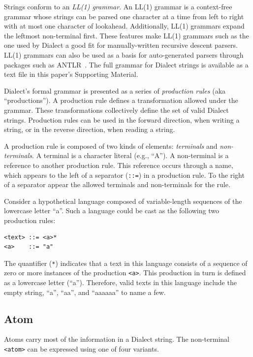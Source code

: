 \documentclass{article}
\def\ttt{\texttt}
\begin{document}
Strings conform to an \textit{LL(1) grammar}.\cite{thain:2020} An LL(1) grammar is a context-free grammar whose strings can be parsed one character at a time from left to right with at most one character of lookahead. Additionally, LL(1) grammars expand the leftmost non-terminal first. These features make LL(1) grammars such as the one used by Dialect a good fit for manually-written recursive descent parsers. LL(1) grammars can also be used as a basis for auto-generated parsers through packages such as ANTLR~\cite{parr:2014}. The full grammar for Dialect strings is available as a text file in this paper's Supporting Material.

Dialect's formal grammar is presented as a series of \textit{production rules} (aka \enquote{productions}). A production rule defines a transformation allowed under the grammar. These transformations collectively define the set of valid Dialect strings. Production rules can be used in the forward direction, when writing a string, or in the reverse direction, when reading a string. 

A production rule is composed of two kinds of elements: \textit{terminals} and \textit{non-terminals}. A terminal is a character literal (e.g., \enquote{A}). A non-terminal is a reference to another production rule. This reference occurs through a name, which appears to the left of a separator (\ttt{::=}) in a production rule. To the right of a separator appear the allowed terminals and non-terminals for the rule.

Consider a hypothetical language composed of variable-length sequences of the lowercase letter \enquote{a}. Such a language could be cast as the following two production rules:

\begin{lstlisting}
<text> ::= <a>*
<a>    ::= "a"
\end{lstlisting}

The quantifier (\ttt{*}) indicates that a text in this language consists of a sequence of zero or more instances of the production \ttt{<a>}. This production in turn is defined as a lowercase letter (\enquote{a}). Therefore, valid texts in this language include the empty string, \enquote{a}, \enquote{aa}, and \enquote{aaaaaa} to name a few.

\subsection*{Atom}

Atoms carry most of the information in a Dialect string. The non-terminal \ttt{<atom>} can be expressed using one of four variants.
\end{document}
